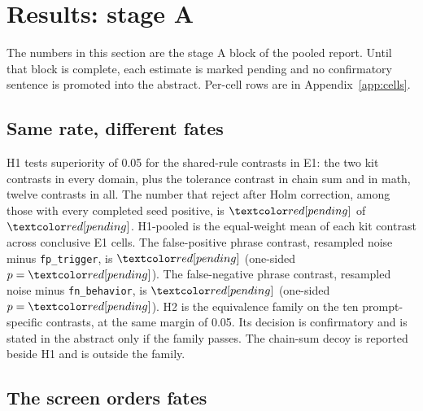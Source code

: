 \section{Results: stage A}
\label{sec:results}

The numbers in this section are the stage A block of the pooled report.
Until that block is complete, each estimate is marked pending and no confirmatory sentence is promoted into the abstract.
Per-cell rows are in Appendix~\ref{app:cells}.

\subsection{Same rate, different fates}
\label{sec:h1}

H1 tests superiority of 0.05 for the shared-rule contrasts in E1: the two kit contrasts in every domain, plus the tolerance contrast in chain sum and in math, twelve contrasts in all.
The number that reject after Holm correction, among those with every completed seed positive, is $\HOneRejected{}$ of $\HOneFamily{}$.
H1-pooled is the equal-weight mean of each kit contrast across conclusive E1 cells.
The false-positive phrase contrast, resampled noise minus \texttt{fp\_trigger}, is $\HOnePooledTrigger{}$ (one-sided $p = \HOnePooledTriggerP{}$).
The false-negative phrase contrast, resampled noise minus \texttt{fn\_behavior}, is $\HOnePooledFn{}$ (one-sided $p = \HOnePooledFnP{}$).
H2 is the equivalence family on the ten prompt-specific contrasts, at the same margin of 0.05.
Its decision is confirmatory and is stated in the abstract only if the family passes.
The chain-sum decoy is reported beside H1 and is outside the family.

\subsection{The screen orders fates}
\label{sec:h3}

